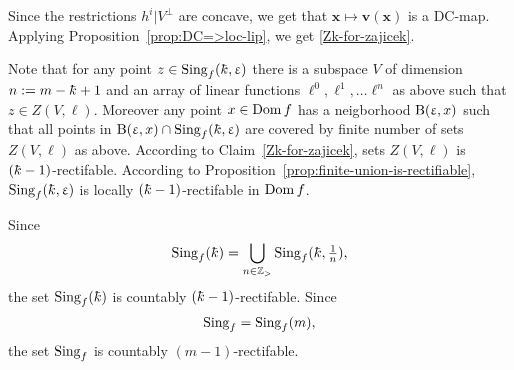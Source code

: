 Since the restrictions  $h^i|V^\bot$ are concave, 
we get that $\bm{x}\mapsto \bm{v}(\bm{x})$ is a DC-map. 
Applying Proposition~\ref{prop:DC=>loc-lip}, we get \ref{Zk-for-zajicek}.
\claimqeds

Note that for any point $z\in \Sing_f(\kay,\eps)$ there is a subspace $V$ of dimension $n\df m-\kay+1$
and an array of linear functions $\ell^0,\ell^1,\dots\ell^{n}$ as above such that $z\in Z(V,\bm{\ell})$.
Moreover any point $x\in \Dom f$ has a neigborhood $\mathrm{B}{}(\upvarepsilon,x)$ such that 
all points in $\oBall(\eps,x)\cap\Sing_f(\kay,\eps)$ are covered by finite number of sets $Z(V,\bm{\ell})$ as above. %
According to Claim~\ref{Zk-for-zajicek}, sets $Z(V,\bm{\ell})$ is $(\kay-1)$-rectifable.
According to Proposition~\ref{prop:finite-union-is-rectifiable},
$\Sing_f(\kay,\eps)$ is locally $(\kay-1)$-rectifable in $\mathop{\rm Dom}\nolimits f$.

Since 
\[\Sing_f(\kay)=\bigcup_{n\in\ZZ_>}\Sing_f(\kay,\tfrac1n),\] 
the set $\Sing_f(\kay)$ is countably $(\kay-1)$-rectifable.
Since 
\[\mathop{\rm Sing}\nolimits_f=\mathop{\rm Sing}\nolimits_f(m),\]
the set $\mathop{\rm Sing}\nolimits_f$ is countably $(m-1)$-rectifable.
\qeds
